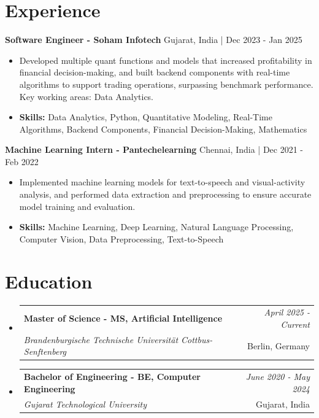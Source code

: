 \documentclass[a4paper,11pt]{article}
\makeatletter
\newcommand{\resumeSubheading}[4]{
\vspace{0.5mm}\item
    \begin{tabular*}{\linewidth}[t]{l@{\extracolsep{\fill}}r}
        \textbf{#1} & \textit{\footnotesize{#4}} \\
        \textit{\footnotesize{#3}} &  \footnotesize{#2}\\
    \end{tabular*}
    \vspace{-2.4mm}
}
\makeatother
\begin{document}
\section{\textbf{Experience}}


\vspace{1mm}
  \textbf{Software Engineer - Soham Infotech} \hfill Gujarat, India | Dec 2023 - Jan 2025
\vspace{-1.5mm} %
\begin{itemize}
  \item Developed multiple quant functions and models that increased profitability in financial decision-making, and built backend components with real-time algorithms to support trading operations, surpassing benchmark performance. Key working areas: Data Analytics.

\vspace{-2mm}
  \item \textbf{Skills:} Data Analytics, Python, Quantitative Modeling, Real-Time Algorithms, Backend Components, Financial Decision-Making, Mathematics
\end{itemize}

\vspace{1mm}
  \textbf{Machine Learning Intern - Pantechelearning} \hfill Chennai, India | Dec 2021 - Feb 2022
\vspace{-1.5mm} %
\begin{itemize}
  \item Implemented machine learning models for text-to-speech and visual-activity analysis, and performed data extraction and preprocessing to ensure accurate model training and evaluation.
\vspace{-2mm}
  \item \textbf{Skills:} Machine Learning, Deep Learning, Natural Language Processing, Computer Vision, Data Preprocessing, Text-to-Speech
\end{itemize}\section{\textbf{Education}}
\vspace{-0.4mm}

\begin{itemize}[leftmargin=0.15in, label={}]
\resumeSubheading
{Master of Science - MS, Artificial Intelligence }{Berlin, Germany}
{Brandenburgische Technische Universität Cottbus-Senftenberg  }{April 2025 - Current}

\vspace{1.0mm} %
\resumeSubheading
{Bachelor of Engineering - BE, Computer Engineering  }{Gujarat, India}
{Gujarat Technological University }{June 2020 - May 2024}

\end{itemize}
\end{document}

